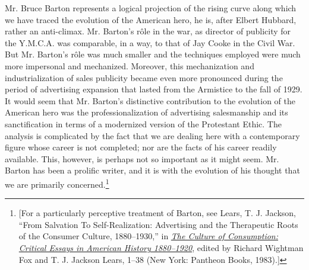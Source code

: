 \documentclass[openany,nobib]{tufte-book}
\begin{document}
  Mr. Bruce Barton represents a logical projection of the rising
curve along which we have traced the evolution of the American hero, he
is, after Elbert Hubbard, rather an anti-climax. Mr. Barton's r\^ole in
the war, as director of publicity for the Y.M.C.A. was comparable, in a
way, to that of Jay Cooke in the Civil War. But Mr. Barton's r\^ole was
much smaller and the techniques employed were much more impersonal and
mechanized. Moreover, this mechanization and industrialization of sales
publicity became even more pronounced during the period of advertising
expansion that lasted from the Armistice to the fall of 1929. It would
seem that Mr. Barton's distinctive contribution to the evolution of the
American hero was the professionalization of advertising salesmanship
and its sanctification in terms of a modernized version of the
Protestant Ethic. The analysis is complicated by the fact that we are
dealing here with a contemporary figure whose career is not completed;
nor are the facts of his career readily available. This, however, is
perhaps not so important as it might seem. Mr. Barton has been a
prolific writer, and it is with the evolution of his thought that we are
primarily concerned.\footnote{{[}For a particularly perceptive treatment of Barton, see Lears, T. J.
  Jackson, ``From Salvation To Self-Realization: Advertising and the
  Therapeutic Roots of the Consumer Culture, 1880--1930,'' in
  \emph{\href{http://www.worldcat.org/oclc/654538769}{The Culture of
  Consumption: Critical Essays in American History 1880--1920}}, edited
  by Richard Wightman Fox and T. J. Jackson Lears, 1--38 (New York:
  Pantheon Books, 1983).{]}}
  
\enlargethispage{\baselineskip}
\end{document}
